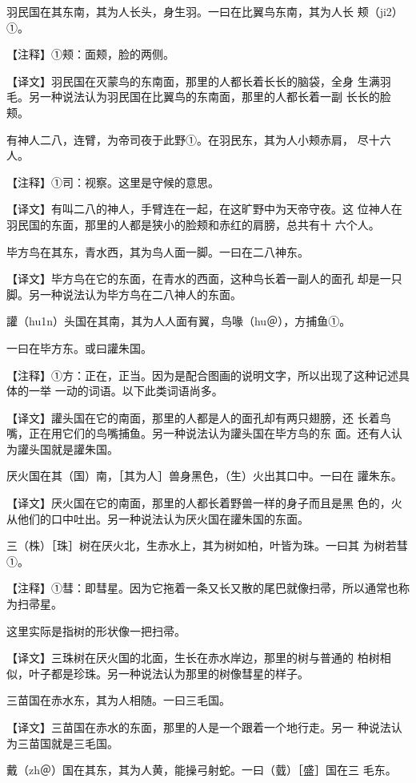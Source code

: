 \documentclass[a4paper,12pt,UTF8,twoside]{ctexbook}
\begin{document}
羽民国在其东南，其为人长头，身生羽。一曰在比翼鸟东南，其为人长 颊（ji2）①。

【注释】①颊：面颊，脸的两侧。

【译文】羽民国在灭蒙鸟的东南面，那里的人都长着长长的脑袋，全身 生满羽毛。另一种说法认为羽民国在比翼鸟的东南面，那里的人都长着一副 长长的脸颊。

有神人二八，连臂，为帝司夜于此野①。在羽民东，其为人小颊赤肩， 尽十六人。

【注释】①司：视察。这里是守候的意思。

【译文】有叫二八的神人，手臂连在一起，在这旷野中为天帝守夜。这 位神人在羽民国的东面，那里的人都是狭小的脸颊和赤红的肩膀，总共有十 六个人。

毕方鸟在其东，青水西，其为鸟人面一脚。一曰在二八神东。

【译文】毕方鸟在它的东面，在青水的西面，这种鸟长着一副人的面孔 却是一只脚。另一种说法认为毕方鸟在二八神人的东面。

讙（hu1n）头国在其南，其为人人面有翼，鸟喙（hu＠），方捕鱼①。

一曰在毕方东。或曰讙朱国。

【注释】①方：正在，正当。因为是配合图画的说明文字，所以出现了这种记述具体的一举 一动的词语。以下此类词语尚多。

【译文】讙头国在它的南面，那里的人都是人的面孔却有两只翅膀，还 长着鸟嘴，正在用它们的鸟嘴捕鱼。另一种说法认为讙头国在毕方鸟的东 面。还有人认为讙头国就是讙朱国。

厌火国在其（国）南，［其为人］兽身黑色，（生）火出其口中。一曰在 讙朱东。

【译文】厌火国在它的南面，那里的人都长着野兽一样的身子而且是黑 色的，火从他们的口中吐出。另一种说法认为厌火国在讙朱国的东面。

三（株）［珠］树在厌火北，生赤水上，其为树如柏，叶皆为珠。一曰其 为树若彗①。

【注释】①彗：即彗星。因为它拖着一条又长又散的尾巴就像扫帚，所以通常也称为扫帚星。

这里实际是指树的形状像一把扫帚。

【译文】三珠树在厌火国的北面，生长在赤水岸边，那里的树与普通的 柏树相似，叶子都是珍珠。另一种说法认为那里的树像彗星的样子。

三苗国在赤水东，其为人相随。一曰三毛国。

【译文】三苗国在赤水的东面，那里的人是一个跟着一个地行走。另一 种说法认为三苗国就是三毛国。

戴（zh＠）国在其东，其为人黄，能操弓射蛇。一曰（臷）［盛］国在三 毛东。
\end{document}
